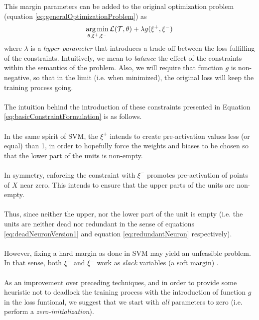 This margin parameters can be added to the original optimization problem  (equation \ref{eq:generalOptimizationProblem}) as
\begin{equation}\label{eq:generalOptimizationProblem}
\operatorname*{arg\,min}_{\theta,\xi^{+},\xi^{-}} \mathcal{L}(\mathcal{T},\theta) + \lambda g(\xi^{+},\xi^{-})
\end{equation}
where $\lambda$ is a \emph{hyper-parameter} that introduces a trade-off between the loss fulfilling of the constraints. Intuitively, we mean to \emph{balance} the effect of the constraints within the semantics of the problem.
Also, we will require that function $g$ is non-negative, so that in the limit (i.e. when minimized), the original loss will keep the training process going. 
\\\\
The intuition behind the introduction of these constraints presented in Equation \ref{eq:basicConstraintFormulation} is as follows. 
\\\\
In the same spirit of SVM, the $\xi^{+}$ intends to create pre-activation values less (or equal) than 1, in order to  hopefully force the weights and biases to be chosen so that the lower part of the units is non-empty. 
\\\\
In symmetry, enforcing the constraint with $\xi^{-}$ promotes pre-activation of points of $X$ near zero. This intends to ensure that the upper parts of the units are non-empty. 
\\\\
Thus, since neither the upper, nor the lower part of the unit is empty (i.e. the units are neither dead nor redundant in the sense of equations \ref{eq:deadNeuronVersion1} and equation \ref{eq:redundantNeuron} respectively).
\\\\
However, fixing a hard margin as done in SVM may yield an unfeasible problem. In that sense, both $\xi^{+}$ and $\xi^{-}$ work as \emph{slack} variables (a soft margin) \cite{Burges1998TutorialOnSVMForPatternRecognition,Hearst1998SupportVectorMachines}.
\\\\
As an improvement over preceding techniques, and in order to provide some heuristic not to deadlock the training process with the introduction of function $g$ in the loss funtional, we suggest that we start with \emph{all} parameters to zero (i.e. perform a \emph{zero-initialization}). 
\\\\
